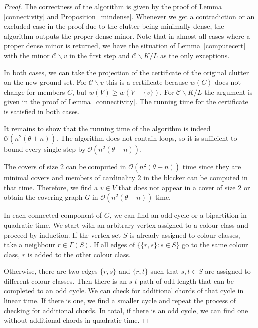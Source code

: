 \documentclass[a4paper, 12pt]{scrbook}
\theoremstyle{definition}
\begin{document}
   \begin{proof}
       The correctness of the algorithm is given by the proof of \hyperref[connectivity]{Lemma \ref*{connectivity}} and \hyperref[mindense]{Proposition~\ref*{mindense}}.
       Whenever we get a contradiction or an excluded case in the proof due to the clutter being minimally dense, the algorithm outputs the proper dense minor.
       Note that in almost all cases where a proper dense minor is returned, we have the situation of \hyperref[computecert]{Lemma~\ref*{computecert}} with the minor $\mathcal{C}\backslash v$ in the first step and $\mathcal{C} \backslash K / L$ as the only exceptions.

       In both cases, we can take the projection of the certificate of the original clutter on the new ground set.
       For $\mathcal{C} \backslash v$ this is a certificate because $w(C)$ does not change for members $C$, but $w(V) \geq w(V-\{v\})$.
       For $\mathcal{C} \backslash K / L$ the argument is given in the proof of \hyperref[connectivity]{Lemma~\ref*{connectivity}}.
       The running time for the certificate is satisfied in both cases.

       It remains to show that the running time of the algorithm is indeed $\mathcal{O}(n^2(\theta+n))$.
       The algorithm does not contain loops, so it is sufficient to bound every single step by $\mathcal{O}(n^2(\theta+n))$.

       The covers of size 2 can be computed in $\mathcal{O}(n^2(\theta+n))$ time since they are minimal covers and members of cardinality 2 in the blocker can be computed in that time.
       Therefore, we find a $v \in V$ that does not appear in a cover of size 2 or obtain the covering graph $G$ in $\mathcal{O}(n^2(\theta+n))$ time.

       In each connected component of $G$, we can find an odd cycle or a bipartition in quadratic time.
       We start with an arbitrary vertex assigned to a colour class and proceed by induction.
       If the vertex set $S$ is already assigned to colour classes, take a neighbour $r \in \Gamma(S)$.
       If all edges of $\{\{r,s\}:s \in S\}$ go to the same colour class, $r$ is added to the other colour class.

       Otherwise, there are two edges $\{r,s\}$ and $\{r,t\}$ such that $s,t \in S$ are assigned to different colour classes.
       Then there is an $s$-$t$-path of odd length that can be completed to an odd cycle.
       We can check for additional chords of that cycle in linear time.
       If there is one, we find a smaller cycle and repeat the process of checking for additional chords.
       In total, if there is an odd cycle, we can find one without additional chords in quadratic time.


\end{proof}
\end{document}

